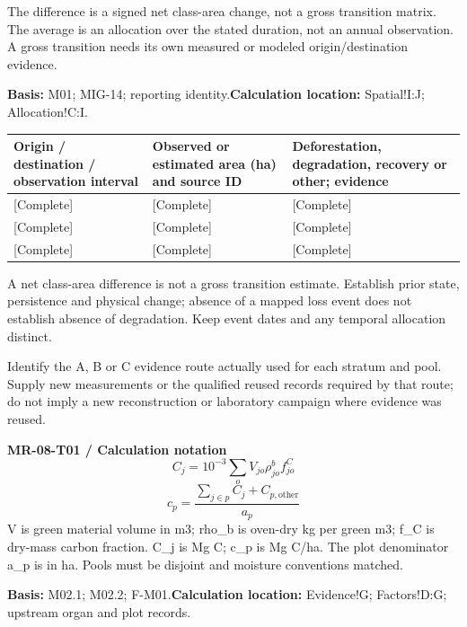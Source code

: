 The difference is a signed net class-area change, not a gross transition matrix. The average is an allocation over the stated duration, not an annual observation. A gross transition needs its own measured or modeled origin/destination evidence.\par
\textbf{Basis:} M01; MIG-14; reporting identity.\quad\textbf{Calculation location:} Spatial!I:J; Allocation!C:I.\par\endgroup
{\sffamily\fontsize{8.6}{10.7}\selectfont\begin{longtable}{@{}P{48mm}P{61mm}P{53mm}@{}}
\toprule
\textbf{Origin / destination / observation interval} & \textbf{Observed or estimated area (ha) and source ID} & \textbf{Deforestation, degradation, recovery or other; evidence}\\\midrule\endhead
\rule{0pt}{8mm}[Complete] & [Complete] & [Complete]\\\hline
\rule{0pt}{8mm}[Complete] & [Complete] & [Complete]\\\hline
\rule{0pt}{8mm}[Complete] & [Complete] & [Complete]\\\hline
\end{longtable}}
A net class-area difference is not a gross transition estimate. Establish prior state, persistence and physical change; absence of a mapped loss event does not establish absence of degradation. Keep event dates and any temporal allocation distinct.\par
{}
Identify the A, B or C evidence route actually used for each stratum and pool. Supply new measurements or the qualified reused records required by that route; do not imply a new reconstruction or laboratory campaign where evidence was reused.\par
{}
\par\begingroup\sffamily\fontsize{8.4}{10.5}\selectfont\color{NEBGreen}
\textbf{MR-08-T01 / Calculation notation}\
{\fontsize{10}{12}\selectfont\[C_j=10^{-3}\sum_o V_{jo}\rho^b_{jo}f^C_{jo}\]}
{\fontsize{10}{12}\selectfont\[c_p=\frac{\sum_{j\in p}C_j+C_{p,\mathrm{other}}}{a_p}\]}
V is green material volume in m3; rho\_b is oven-dry kg per green m3; f\_C is dry-mass carbon fraction. C\_j is Mg C; c\_p is Mg C/ha. The plot denominator a\_p is in ha. Pools must be disjoint and moisture conventions matched.\par
\textbf{Basis:} M02.1; M02.2; F-M01.\quad\textbf{Calculation location:} Evidence!G; Factors!D:G; upstream organ and plot records.\par\endgroup
